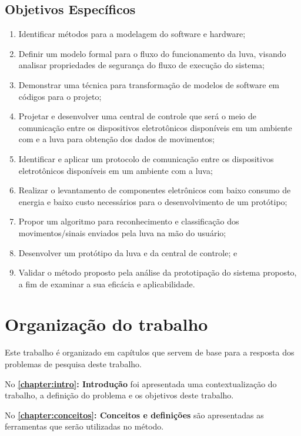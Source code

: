 \subsection{Objetivos Específicos}
\begin{enumerate}
    \item Identificar métodos para a modelagem do software e hardware;
    \item Definir um modelo formal para o fluxo do funcionamento da luva, visando analisar propriedades de segurança do fluxo de execução do sistema;
    \item Demonstrar uma técnica para transformação de modelos de software em códigos para o projeto;
    \item Projetar e desenvolver uma central de controle que será o meio de comunicação entre os dispositivos eletrotônicos disponíveis em um ambiente com e a luva para obtenção dos dados de movimentos;
    \item Identificar e aplicar um protocolo de comunicação entre os dispositivos eletrotônicos disponíveis em um ambiente com a luva;
    \item Realizar o levantamento de componentes eletrônicos com baixo consumo de energia e baixo custo necessários para o desenvolvimento de um protótipo;    
    \item Propor um algoritmo para reconhecimento e classificação dos movimentos/sinais enviados pela luva na mão do usuário;
    \item Desenvolver um protótipo da luva e da central de controle; e
    \item Validar o método proposto pela análise da prototipação do sistema proposto, a fim de examinar a sua eficácia e aplicabilidade. 
\end{enumerate}

\newpage

\section{Organização do trabalho}

Este trabalho é organizado em capítulos que servem de base para a resposta dos problemas de pesquisa deste trabalho.

No \textbf{\autoref{chapter:intro}: Introdução} foi apresentada uma contextualização do trabalho, a definição do problema e os objetivos deste trabalho.

No \textbf{\autoref{chapter:conceitos}: Conceitos e definições} são apresentadas as ferramentas que serão utilizadas no método.

